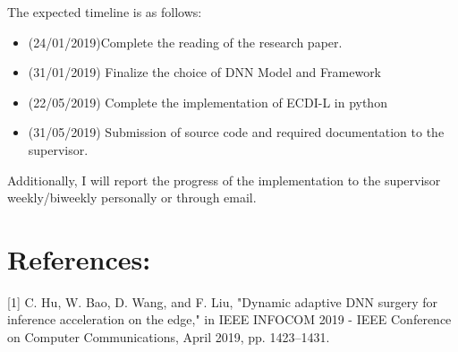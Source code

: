 \documentclass{article}
\begin{document}
\begin{normalsize}
        The expected timeline is as follows:  \\
        

        
        \begin{itemize}
        
\item(24/01/2019)Complete the reading of the research paper.
\item (31/01/2019) Finalize the choice of DNN Model and Framework
\item(22/05/2019) Complete the implementation of ECDI-L in python 
\item(31/05/2019) Submission of source code and required documentation to the supervisor.
        \end{itemize}
        
        Additionally, I will report the progress of the implementation to the supervisor weekly/biweekly personally or through email.
         
    	\section{References:}
        [1] C. Hu, W. Bao, D. Wang, and F. Liu, "Dynamic adaptive DNN surgery for inference acceleration on the edge," in IEEE INFOCOM 2019 - IEEE Conference on Computer Communications, April 2019, pp. 1423–1431.
\end{normalsize}
\end{document}
